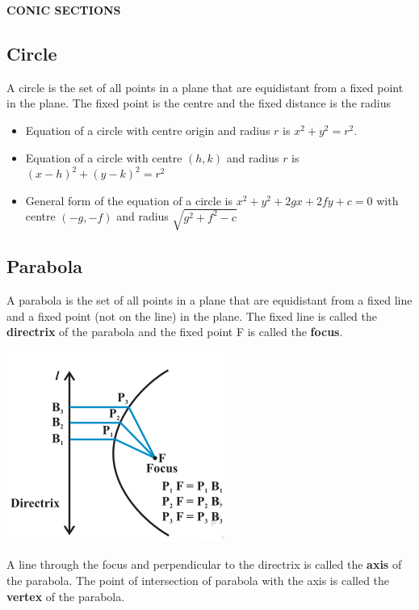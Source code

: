 \documentclass[12pt]{article}
\begin{document}
\begin{center}
    {\LARGE \textbf{CONIC SECTIONS} }
\end{center}

\begin{multicols}{2}

    \subsection*{Circle}
    A circle is the set of all points in a plane that are equidistant from a fixed point in the plane. The fixed point is the centre and the fixed distance is the radius
    \begin{itemize}
        \item Equation of a circle with centre origin and radius $r$ is $x^2 + y^2 = r^2.$
        \item Equation of a circle with centre $(h, k)$ and radius $r$ is $(x - h)^2 + (y - k)^2 = r^2$
        \item General form of the equation of a circle is $x^2 + y^2 + 2gx + 2fy + c = 0$ with centre $(-g, -f)$ and radius $\sqrt{g^2+f^2-c}$
    \end{itemize}

    \subsection*{Parabola}
    A parabola is the set of all points
in a plane that are equidistant from a fixed line
and a fixed point (not on the line) in the plane.
The fixed line is called the \textbf{directrix} of
the parabola and the fixed point F is called the
\textbf{focus}.


\begin{center}
    \includegraphics*[scale=0.5]{f.png}
\end{center}
A line through the focus and perpendicular
to the directrix is called the \textbf{axis} of the
parabola. The point of intersection of parabola
with the axis is called the \textbf{vertex} of the parabola.


\end{multicols}
\end{document}
